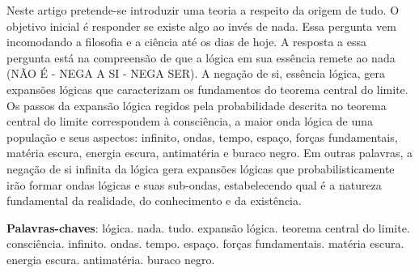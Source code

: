 \vspace{-20mm}
\maketitle
\vspace{-8mm}
\begin{resumoumacoluna}
\vspace{-2mm}
	Neste artigo pretende-se introduzir uma teoria a respeito da origem de tudo. O objetivo inicial é responder se existe algo ao invés de nada. Essa pergunta vem incomodando a filosofia e a ciência até os dias de hoje. A resposta a essa pergunta está na compreensão de que a lógica em sua essência remete ao nada (NÃO É - NEGA A SI - NEGA SER). A negação de si, essência lógica, gera expansões lógicas que caracterizam os fundamentos do teorema central do limite. Os passos da expansão lógica regidos pela probabilidade descrita no teorema central do limite correspondem à consciência, a maior onda lógica de uma população e seus aspectos: infinito, ondas, tempo, espaço, forças fundamentais, matéria escura, energia escura, antimatéria e buraco negro. Em outras palavras, a negação de si infinita da lógica gera expansões lógicas que probabilisticamente irão formar ondas lógicas e suas sub-ondas, estabelecendo qual é a natureza fundamental da realidade, do conhecimento e da existência.
 \noindent
 
 \textbf{Palavras-chaves}: lógica. nada. tudo. expansão lógica. teorema central do limite. consciência. infinito. ondas. tempo. espaço. forças fundamentais. matéria escura. energia escura. antimatéria. buraco negro.
\end{resumoumacoluna}

